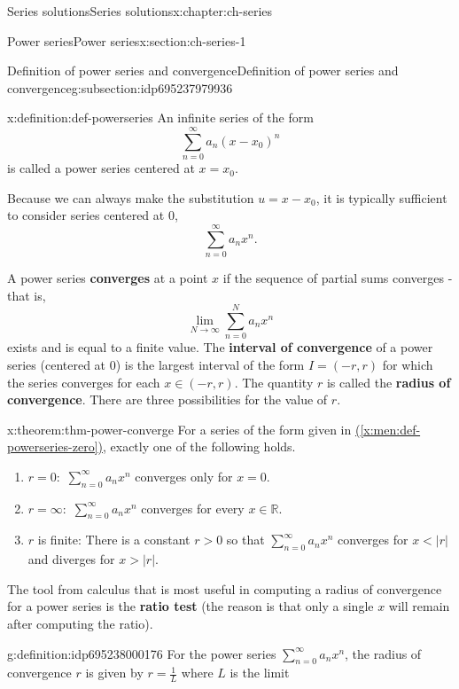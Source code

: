 \documentclass[oneside,10pt,]{book}
\newcommand{\xreffont}{\relax}
\newcommand{\terminology}[1]{\textbf{#1}}
\numberwithin{equation}{section}
\newcommand{\R}{\mathbb{R}}
\newcommand{\abs}[1]{\left\vert#1\right\vert}
\numberwithin{equation}{section}
\newcommand{\ps}{\displaystyle \sum_{n=0}^\infty a_n x^n}
\newcommand{\lt}{<}
\begin{document}
\begin{chapterptx}{Series solutions}{}{Series solutions}{}{}{x:chapter:ch-series}
\begin{sectionptx}{Power series}{}{Power series}{}{}{x:section:ch-series-1}
\begin{subsectionptx}{Definition of power series and convergence}{}{Definition of power series and convergence}{}{}{g:subsection:idp695237979936}
\begin{definition}{}{x:definition:def-powerseries}%
An infinite series of the form%
\begin{equation*}
\sum_{n=0}^\infty a_n (x - x_0)^n
\end{equation*}
is called a power series centered at \(x = x_0\).%
\par
Because we can always make the substitution \(u = x-x_0\), it is typically sufficient to consider series centered at \(0\),%
\begin{equation}
\sum_{n=0}^\infty a_n x^n.\label{x:men:def-powerseries-zero}
\end{equation}
%
\end{definition}
A power series \terminology{converges} at a point \(x\) if the sequence of partial sums converges - that is,%
\begin{equation*}
\lim_{N \to \infty} \sum_{n = 0}^N a_n x^n
\end{equation*}
exists and is equal to a finite value. The \terminology{interval of convergence} of a power series (centered at 0) is the largest interval of the form \(I = (-r,r)\) for which the series converges for each \(x \in (-r,r)\). The quantity \(r\) is called the \terminology{radius of convergence}. There are three possibilities for the value of \(r\).%
\begin{theorem}{}{}{x:theorem:thm-power-converge}%
For a series of the form given in \hyperref[x:men:def-powerseries-zero]{({\xreffont\ref{x:men:def-powerseries-zero}})}, exactly one of the following holds.%
\begin{enumerate}
\item{}\(r = 0:\) \(\ps\) converges only for \(x = 0\).%
\item{}\(r = \infty:\) \(\ps\) converges for every \(x \in \R\).%
\item{}\(r\) is finite: There is a constant \(r > 0\) so that \(\ps\) converges for \(x \lt \abs{r}\) and diverges for \(x > \abs{r}\).%
\end{enumerate}
%
\end{theorem}
The tool from calculus that is most useful in computing a radius of convergence for a power series is the \terminology{ratio test} (the reason is that only a single \(x\) will remain after computing the ratio).%
\begin{definition}{}{g:definition:idp695238000176}%
For the power series \(\ps\), the radius of convergence \(r\) is given by \(r = \frac{1}{L}\) where \(L\) is the limit%
\begin{equation*}

\end{equation*}
\end{definition}
\end{subsectionptx}
\end{sectionptx}
\end{chapterptx}
\end{document}

